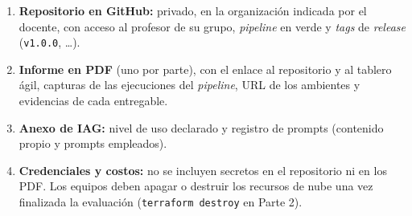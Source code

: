\documentclass[10pt,letterpaper]{article}
\begin{document}
\small
\begin{enumerate}
  \item \textbf{Repositorio en GitHub:} privado, en la organización indicada por el docente, con acceso al profesor de su grupo, \textit{pipeline} en verde y \textit{tags} de \textit{release} (\texttt{v1.0.0}, \dots).
  \item \textbf{Informe en PDF} (uno por parte), con el enlace al repositorio y al tablero ágil, capturas de las ejecuciones del \textit{pipeline}, URL de los ambientes y evidencias de cada entregable.
  \item \textbf{Anexo de IAG:} nivel de uso declarado y registro de prompts (contenido propio y prompts empleados).
  \item \textbf{Credenciales y costos:} no se incluyen secretos en el repositorio ni en los PDF. Los equipos deben apagar o destruir los recursos de nube una vez finalizada la evaluación (\texttt{terraform destroy} en Parte 2).
\end{enumerate}
\end{document}
